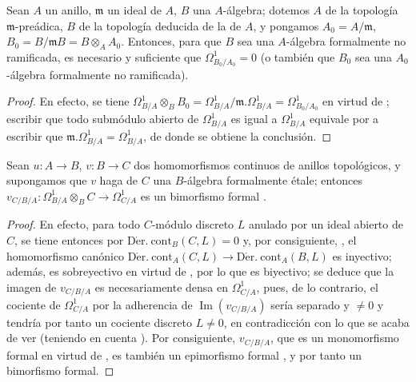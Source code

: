\begin{corollary}[20.7.5]
\label{0.20.7.5-fr}
Sean $A$ un anillo, $\mathfrak{m}$ un ideal de $A$, $B$ una $A$-álgebra;
dotemos $A$ de la topología $\mathfrak{m}$-preádica, $B$ de la topología
deducida de la de $A$, y pongamos $A_0=A/\mathfrak{m}$,
$B_0=B/\mathfrak{m}B=B\otimes_A A_0$. Entonces, para que $B$ sea una
$A$-álgebra formalmente no ramificada, es necesario y suficiente que
$\Omega^1_{B_0/A_0}=0$ \textup{(o también que $B_0$ sea una} $A_0$-álgebra
formalmente no ramificada).
\end{corollary}

\begin{proof}
En efecto, se tiene
$\Omega^1_{B/A}\otimes_B B_0=\Omega^1_{B/A}/\mathfrak{m}.\Omega^1_{B/A}
=\Omega^1_{B_0/A_0}$ en virtud de ; escribir que todo
submódulo abierto de $\Omega^1_{B/A}$ es igual a $\Omega^1_{B/A}$ equivale
por  a escribir que
$\mathfrak{m}.\Omega^1_{B/A}=\Omega^1_{B/A}$, de donde se obtiene la conclusión.
\end{proof}

\begin{proposition}[20.7.6]
\label{0.20.7.6-fr}
Sean $u:A\to B$, $v:B\to C$ dos homomorfismos continuos de anillos
topológicos, y supongamos que $v$ haga de $C$ una $B$-álgebra formalmente
étale; entonces $v_{C/B/A}:\Omega^1_{B/A}\otimes_B C\to\Omega^1_{C/A}$ es un
bimorfismo formal \textup{}.
\end{proposition}

\begin{proof}
En efecto, para todo $C$-módulo discreto $L$ anulado por un ideal abierto de $C$,
se tiene entonces por 
$\operatorname{D\acute{e}r.\ cont}_B(C,L)=0$ y, por consiguiente,
, el homomorfismo canónico
$\operatorname{D\acute{e}r.\ cont}_A(C,L)\to
\operatorname{D\acute{e}r.\ cont}_A(B,L)$ es inyectivo; además, es
sobreyectivo en virtud de , por lo que es biyectivo; se deduce
que la imagen de $v_{C/B/A}$ es necesariamente densa en $\Omega^1_{C/A}$,
pues, de lo contrario, el cociente de $\Omega^1_{C/A}$ por la adherencia de
$\operatorname{Im}(v_{C/B/A})$ sería separado y $\neq0$ y tendría por tanto un
cociente discreto $L\neq0$, en contradicción con lo que se acaba de ver
(teniendo en cuenta ). Por consiguiente, $v_{C/B/A}$, que es un
monomorfismo formal en virtud de , es también un epimorfismo formal
, y por tanto un bimorfismo formal.
\end{proof}

